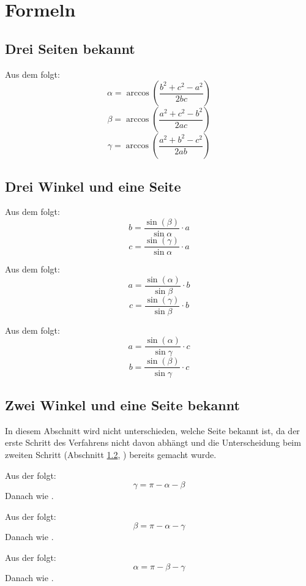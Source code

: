 \documentclass[ngerman,12pt]{scrartcl}
\begin{document}
\section{Formeln}
\subsection{Drei Seiten bekannt}

\begin{fall}[a,b,c]\label{abc}
Aus dem  folgt:
$$ \alpha =  \arccos \left(\frac{b^2 + c^2 - a^2}{2bc} \right)$$
$$ \beta =  \arccos \left( \frac{a^2 + c^2 - b^2}{2ac} \right)$$
$$ \gamma =  \arccos \left(\frac{a^2 + b^2 - c^2}{2ab} \right)$$
\end{fall}

\subsection{Drei Winkel und eine Seite}\label{wwws}
\begin{fall}\label{axyz}
Aus dem  folgt:
$$b = \frac{\sin(\beta)}{\sin{\alpha}} \cdot a $$
$$c = \frac{\sin(\gamma)}{\sin{\alpha}} \cdot a $$
\end{fall}
\begin{fall}\label{bxyz}
Aus dem  folgt:
$$a = \frac{\sin(\alpha)}{\sin{\beta}} \cdot b $$
$$c = \frac{\sin(\gamma)}{\sin{\beta}} \cdot b $$
\end{fall}
\begin{fall}\label{cxyz}
Aus dem  folgt:
$$a = \frac{\sin(\alpha)}{\sin{\gamma}} \cdot c $$
$$b = \frac{\sin(\beta)}{\sin{\gamma}} \cdot c $$
\end{fall}


\subsection{Zwei Winkel und eine Seite bekannt}
In diesem Abschnitt wird nicht unterschieden, welche Seite bekannt ist, da der erste Schritt des Verfahrens nicht davon abhängt und die Unterscheidung beim zweiten Schritt (Abschnitt \ref{wwws}, ) bereits  gemacht wurde.

\begin{fall}[$\alpha, \beta$]\label{xy}
Aus der  folgt:
$$\gamma = \pi - \alpha - \beta $$
Danach wie .
\end{fall}
\begin{fall}[$\alpha, \gamma$]\label{xz}
Aus der  folgt:
$$\beta = \pi - \alpha - \gamma $$
Danach wie .
\end{fall}
\begin{fall}[$\beta, \gamma$]\label{yz}
Aus der  folgt:
$$\alpha = \pi - \beta - \gamma $$
Danach wie .
\end{fall}
\end{document}
